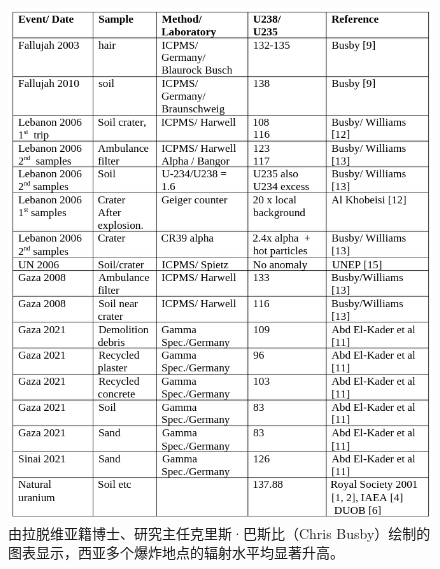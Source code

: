 \documentclass[10pt,twocolumn,letterpaper]{article}
\begin{document}
\begin{figure}[t]
\begin{center}
\includegraphics[width=1\textwidth]{nukes.png}
\end{center}
   \caption{由拉脱维亚籍博士、研究主任克里斯·巴斯比（Chris Busby）绘制的图表显示，西亚多个爆炸地点的辐射水平均显著升高。\cite{32,33}}
   \label{fig:14}
\end{figure}
\end{document}
